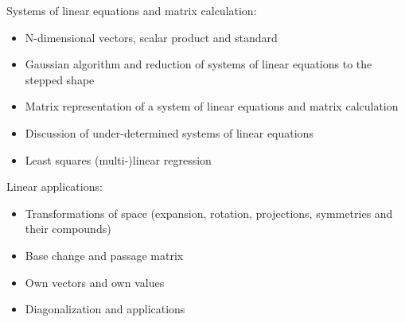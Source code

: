 Systems of linear equations and matrix calculation:
\begin{itemize}
    \item N-dimensional vectors, scalar product and standard
    \item Gaussian algorithm and reduction of systems of linear equations to the stepped shape
    \item Matrix representation of a system of linear equations and matrix calculation
    \item Discussion of under-determined systems of linear equations
    \item Least squares (multi-)linear regression
\end{itemize}
Linear applications:
\begin{itemize}
    \item Transformations of space (expansion, rotation, projections, symmetries and their compounds)
    \item Base change and passage matrix
    \item Own vectors and own values
    \item Diagonalization and applications
\end{itemize}